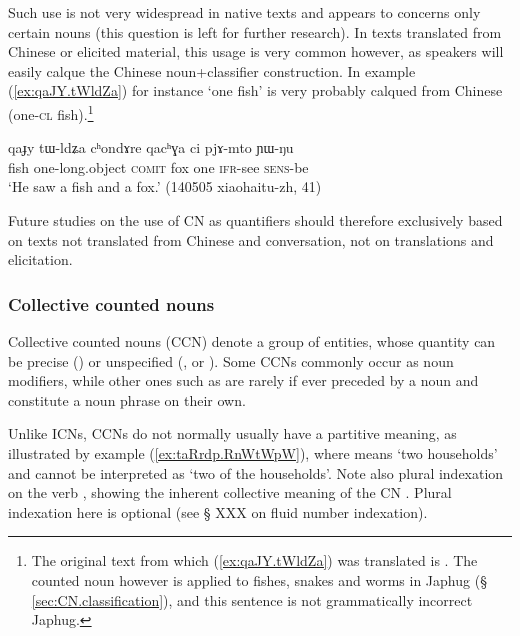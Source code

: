 Such use is not very widespread in native texts and appears to concerns only certain nouns (this question is left for further research). In texts translated from Chinese or elicited material, this usage is very common however, as speakers will easily calque the Chinese noun+classifier construction. In example (\ref{ex:qaJY.tWldZa}) for instance  `one fish' is very probably calqued from Chinese   (one-\textsc{cl} fish).\footnote{The original text from which (\ref{ex:qaJY.tWldZa}) was translated is . The counted noun  however is applied to fishes, snakes and worms in Japhug (§ \ref{sec:CN.classification}), and this sentence is not grammatically incorrect Japhug. } 

\begin{exe}
\ex \label{ex:qaJY.tWldZa}
\gll qaɟy tɯ-ldʑa cʰondɤre qacʰɣa ci pjɤ-mto ɲɯ-ŋu \\
fish one-long.object \textsc{comit} fox one \textsc{ifr}-see \textsc{sens}-be \\
\glt `He saw a fish and a fox.' (140505 xiaohaitu-zh, 41)
\end{exe} 

Future studies on the use of CN as quantifiers should therefore exclusively based on texts not translated from Chinese and conversation, not on translations and elicitation.

\subsubsection{Collective counted nouns} \label{sec:CCN}
Collective counted nouns (CCN) denote a group of entities, whose quantity can be precise () or unspecified (,  or ). Some CCNs commonly occur as noun modifiers, while other ones such as  are rarely if ever preceded by a noun and constitute a noun phrase on their own.

Unlike ICNs, CCNs do not normally usually have a partitive meaning, as illustrated by example (\ref{ex:taRrdp.RnWtWpW}), where  means `two households' and cannot be interpreted as `two of the households'. Note also plural indexation on the verb , showing the inherent collective meaning of the CN . Plural indexation here is optional (see § XXX on fluid number indexation).

